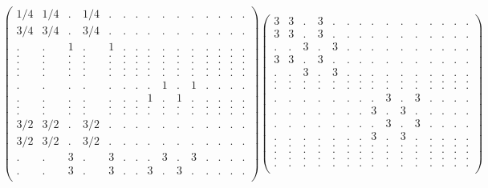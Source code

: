 \documentclass[12pt,a4paper]{amsart}
\begin{document}
\begin{align*}
\left(\begin{array}{rrrrrrrrrrrrrrr}%
1/4&1/4&.&1/4&.&.&.&.&.&.&.&.&.&.&.\\%
3/4&3/4&.&3/4&.&.&.&.&.&.&.&.&.&.&.\\%
.&.&1&.&1&.&.&.&.&.&.&.&.&.&.\\%
.&.&.&.&.&.&.&.&.&.&.&.&.&.&.\\%
.&.&.&.&.&.&.&.&.&.&.&.&.&.&.\\%
.&.&.&.&.&.&.&.&.&.&.&.&.&.&.\\%
.&.&.&.&.&.&.&.&.&.&.&.&.&.&.\\%
.&.&.&.&.&.&.&.&1&.&1&.&.&.&.\\%
.&.&.&.&.&.&.&1&.&1&.&.&.&.&.\\%
.&.&.&.&.&.&.&.&.&.&.&.&.&.&.\\%
.&.&.&.&.&.&.&.&.&.&.&.&.&.&.\\%
3/2&3/2&.&3/2&.&.&.&.&.&.&.&.&.&.&.\\%
3/2&3/2&.&3/2&.&.&.&.&.&.&.&.&.&.&.\\%
.&.&3&.&3&.&.&.&3&.&3&.&.&.&.\\%
.&.&3&.&3&.&.&3&.&3&.&.&.&.&.\\%
\end{array}\right)%
\left(\begin{array}{rrrrrrrrrrrrrrr}%
3&3&.&3&.&.&.&.&.&.&.&.&.&.&.\\%
3&3&.&3&.&.&.&.&.&.&.&.&.&.&.\\%
.&.&3&.&3&.&.&.&.&.&.&.&.&.&.\\%
3&3&.&3&.&.&.&.&.&.&.&.&.&.&.\\%
.&.&3&.&3&.&.&.&.&.&.&.&.&.&.\\%
.&.&.&.&.&.&.&.&.&.&.&.&.&.&.\\%
.&.&.&.&.&.&.&.&.&.&.&.&.&.&.\\%
.&.&.&.&.&.&.&.&3&.&3&.&.&.&.\\%
.&.&.&.&.&.&.&3&.&3&.&.&.&.&.\\%
.&.&.&.&.&.&.&.&3&.&3&.&.&.&.\\%
.&.&.&.&.&.&.&3&.&3&.&.&.&.&.\\%
.&.&.&.&.&.&.&.&.&.&.&.&.&.&.\\%
.&.&.&.&.&.&.&.&.&.&.&.&.&.&.\\%
.&.&.&.&.&.&.&.&.&.&.&.&.&.&.\\%
.&.&.&.&.&.&.&.&.&.&.&.&.&.&.\\%
\end{array}\right)%
\end{align*}
\end{document}
